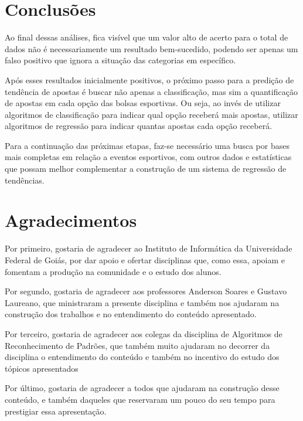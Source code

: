 \documentclass[thesis]{hmcposter}
\begin{document}
\begin{poster}
\section{Conclusões}

Ao final dessas análises, fica visível que um valor alto de acerto para o total de dados não é necessariamente um resultado bem-sucedido, podendo ser apenas um falso positivo que ignora a situação das categorias em específico.

Após esses resultados inicialmente positivos, o próximo passo para a predição de tendência de apostas é buscar não apenas a classificação, mas sim a quantificação de apostas em cada opção das bolsas esportivas. Ou seja, ao invés de utilizar algoritmos de classificação para indicar qual opção receberá mais apostas, utilizar algoritmos de regressão para indicar quantas apostas cada opção receberá.

Para a continuação das próximas etapas, faz-se necessário uma busca por bases mais completas em relação a eventos esportivos, com outros dados e estatísticas que possam melhor complementar a construção de um sistema de regressão de tendências.



\section{Agradecimentos}

Por primeiro, gostaria de agradecer ao Instituto de Informática da Universidade Federal de Goiás, por dar apoio e ofertar disciplinas que, como essa, apoiam e fomentam a produção na comunidade e o estudo dos alunos.

Por segundo, gostaria de agradecer aos professores Anderson Soares e Gustavo Laureano, que ministraram a presente disciplina e também nos ajudaram na construção dos trabalhos e no entendimento do conteúdo apresentado.

Por terceiro, gostaria de agradecer aos colegas da disciplina de Algoritmos de Reconhecimento de Padrões, que também muito ajudaram no decorrer da disciplina o entendimento do conteúdo e também no incentivo do estudo dos tópicos apresentados

Por último, gostaria de agradecer a todos que ajudaram na construção desse conteúdo, e também daqueles que reservaram um pouco do seu tempo para prestigiar essa apresentação.


\end{poster}
\end{document}
